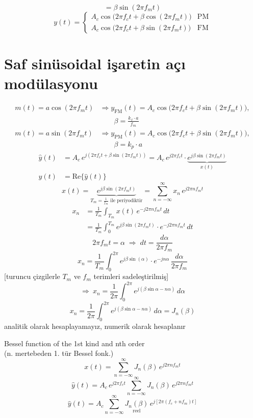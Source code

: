 \documentclass[11pt,a4paper]{article}
\begin{document}
\[ =\beta\sin(2\pi f_m t) \]
\[ y(t)=\begin{cases} A_c\cos\big(2\pi f_c t+\beta\cos(2\pi f_m t)\big) & \text{PM}\\ A_c\cos\big(2\pi f_c t+\beta\sin(2\pi f_m t)\big) & \text{FM}\end{cases} \]

\section{Saf sinüsoidal işaretin açı modülasyonu}
\begin{align*}
m(t)=a\cos(2\pi f_m t)&\Rightarrow y_{\mathrm{FM}}(t)=A_c\cos\big(2\pi f_c t+\beta\sin(2\pi f_m t)\big),\\
&\qquad \beta=\frac{k_f\cdot a}{f_m}\\
m(t)=a\sin(2\pi f_m t)&\Rightarrow y_{\mathrm{PM}}(t)=A_c\cos\big(2\pi f_c t+\beta\sin(2\pi f_m t)\big),\\
&\qquad \beta=k_p\cdot a
\end{align*}
\begin{align*}
\hat y(t)&=A_c\,e^{j\left(2\pi f_c t+\beta\sin(2\pi f_m t)\right)}=A_c\,e^{j2\pi f_c t}\cdot\underbrace{e^{j\beta\sin(2\pi f_m t)}}_{x(t)}\\
y(t)&=\mathrm{Re}\{\hat y(t)\}
\end{align*}
\[ x(t)=\underbrace{e^{j\beta\sin(2\pi f_m t)}}_{T_m=\frac{1}{f_m}\text{ ile periyodiktir}}=\sum_{n=-\infty}^{\infty}x_n\,e^{j2\pi n f_m t} \]
\begin{align*}
x_n&=\frac{1}{T_m}\int_{T_m}x(t)\,e^{-j2\pi n f_m t}\,dt\\
&=\frac{1}{T_m}\int_0^{T_m}e^{j\beta\sin(2\pi f_m t)}\cdot e^{-j2\pi n f_m t}\,dt
\end{align*}
\[ 2\pi f_m t=\alpha\;\Rightarrow\;dt=\frac{d\alpha}{2\pi f_m} \]
\[ x_n=\frac{1}{T_m}\int_0^{2\pi}e^{j\beta\sin(\alpha)}\cdot e^{-jn\alpha}\,\frac{d\alpha}{2\pi f_m} \]
[turuncu çizgilerle $T_m$ ve $f_m$ terimleri sadeleştirilmiş]
\[ \Rightarrow\ x_n=\frac{1}{2\pi}\int_0^{2\pi}e^{j(\beta\sin\alpha-n\alpha)}\,d\alpha \]
\[ x_n=\frac{1}{2\pi}\int_0^{2\pi}e^{j(\beta\sin\alpha-n\alpha)}\,d\alpha=J_n(\beta) \]
analitik olarak hesaplayamayız, numerik olarak hesaplanır

Bessel function of the 1st kind and nth order\\
(n. mertebeden 1. tür Bessel fonk.)
\[ x(t)=\sum_{n=-\infty}^{\infty}J_n(\beta)\,e^{j2\pi n f_m t} \]
\[ \hat y(t)=A_c\,e^{j2\pi f_c t}\sum_{n=-\infty}^{\infty}J_n(\beta)\,e^{j2\pi n f_m t} \]
\[ \hat y(t)=A_c\sum_{n=-\infty}^{\infty}\underset{\text{reel}}{J_n(\beta)}\,e^{j[2\pi(f_c+nf_m)t]} \]
\end{document}
